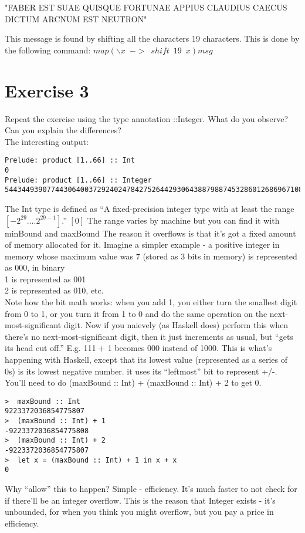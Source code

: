 \documentclass{article}
\begin{document}
"FABER EST SUAE QUISQUE FORTUNAE APPIUS CLAUDIUS CAECUS DICTUM ARCNUM EST NEUTRON"

This message is found by shifting all the characters 19 characters. This is done by the following command:
$map (\backslash x \enspace -> \enspace shift \enspace 19 \enspace x)msg$

\newpage
\section*{Exercise 3}
Repeat the exercise using the type annotation ::Integer. What do you observe? Can you explain the differences?\\
\newline
The interesting output:
\begin{lstlisting}
Prelude: product [1..66] :: Int
0
Prelude: product [1..66] :: Integer
544344939077443064003729240247842752644293064388798874532860126869671081148416000000000000000
\end{lstlisting}
The Int type is defined as ``A fixed-precision integer type with at least the range $[-2^{29} \dots. 2^{29-1}]$.'' $[0]$ The range varies by machine but you can find it with minBound and maxBound
\newline
The reason it overflows is that it's got a fixed amount of memory allocated for it. Imagine a simpler example - a positive integer in memory whose maximum value was 7 (stored as 3 bits in memory)
\newline
{} is represented as 000, in binary\\
1 is represented as 001\\
2 is represented as 010, etc.\\
\newline
Note how the bit math works: when you add 1, you either turn the smallest digit from 0 to 1, or you turn it from 1 to 0 and do the same operation on the next-most-significant digit.
\newline
\newline
Now if you naievely (as Haskell does) perform this when there's no next-most-significant digit, then it just increments as usual, but ``gets its head cut off.'' E.g. 111 + 1 becomes 000 instead of 1000. This is what's happening with Haskell, except that its lowest value (represented as a series of 0s) is its lowest negative number. it uses its ``leftmost'' bit to represent +/-. You'll need to do (maxBound :: Int) + (maxBound :: Int) + 2 to get 0.
\begin{lstlisting}
>  maxBound :: Int
9223372036854775807
>  (maxBound :: Int) + 1
-9223372036854775808
>  (maxBound :: Int) + 2
-9223372036854775807
>  let x = (maxBound :: Int) + 1 in x + x
0
\end{lstlisting}
Why ``allow'' this to happen? Simple - efficiency. It's much faster to not check for if there'll be an integer overflow. This is the reason that Integer exists - it's unbounded, for when you think you might overflow, but you pay a price in efficiency.
\end{document}

